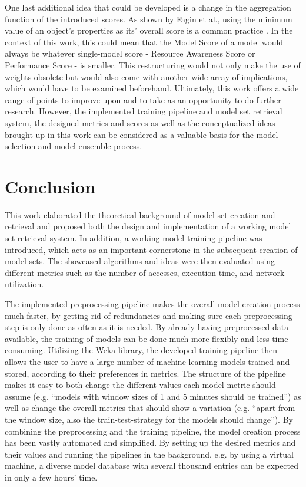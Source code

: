 One last additional idea that could be developed is a change in the aggregation function of the introduced scores. As shown by Fagin et al., using the minimum value of an object's properties as its’ overall score is a common practice \cite{fagin2002}. In the context of this work, this could mean that the Model Score of a model would always be whatever single-model score - Resource Awareness Score or Performance Score - is smaller. This restructuring would not only make the use of weights obsolete but would also come with another wide array of implications, which would have to be examined beforehand. Ultimately, this work offers a wide range of points to improve upon and to take as an opportunity to do further research. However, the implemented training pipeline and model set retrieval system, the designed metrics and scores as well as the conceptualized ideas brought up in this work can be considered as a valuable basis for the model selection and model ensemble process.




\section{Conclusion}

This work elaborated the theoretical background of model set creation and retrieval and proposed both the design and implementation of a working model set retrieval system. In addition, a working model training pipeline was introduced, which acts as an important cornerstone in the subsequent creation of model sets. The showcased algorithms and ideas were then evaluated using different metrics such as the number of accesses, execution time, and network utilization.

The implemented preprocessing pipeline makes the overall model creation process much faster, by getting rid of redundancies and making sure each preprocessing step is only done as often as it is needed. By already having preprocessed data available, the training of models can be done much more flexibly and less time-consuming. Utilizing the Weka library, the developed training pipeline then allows the user to have a large number of machine learning models trained and stored, according to their preferences in metrics. The structure of the pipeline makes it easy to both change the different values each model metric should assume (e.g. “models with window sizes of 1 and 5 minutes should be trained”) as well as change the overall metrics that should show a variation (e.g. “apart from the window size, also the train-test-strategy for the models should change”). By combining the preprocessing and the training pipeline, the model creation process has been vastly automated and simplified. By setting up the desired metrics and their values and running the pipelines in the background, e.g. by using a virtual machine, a diverse model database with several thousand entries can be expected in only a few hours’ time.

